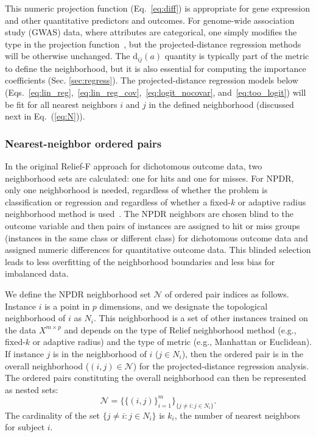 \documentclass[10pt]{article}
\begin{document}
This numeric projection function (Eq.~\ref{eq:diff}) is appropriate for gene expression and other quantitative predictors and outcomes. For genome-wide association study (GWAS) data, where attributes are categorical, one simply modifies the type in the projection function~\cite{titv}, but the projected-distance regression methods will be otherwise unchanged. The $\text{d}_{ij}(a)$ quantity is typically part of the metric to define the neighborhood, but it is also essential for computing the importance coefficients (Sec. \ref{sec:regress}).  The projected-distance regression models below (Eqs.~\ref{eq:lin_reg},~\ref{eq:lin_reg_cov},~\ref{eq:logit_nocovar}, and~\ref{eq:too_logit}) will be fit for all nearest neighbors $i$ and $j$ in the defined neighborhood (discussed next in Eq.~(\ref{eq:N})). 

\subsubsection{Nearest-neighbor ordered pairs}
In the original Relief-F approach for dichotomous outcome data, two neighborhood sets are calculated: one for hits and one for misses.
For NPDR, only one neighborhood is needed, regardless of whether the problem is classification or regression and regardless of whether a fixed-$k$ or adaptive radius neighborhood method is used~\cite{greene09,urbanowicz17,mckinney13}. The NPDR neighbors are chosen blind to the outcome variable and then pairs of instances are assigned to hit or miss groups (instances in the same class or different class) for dichotomous outcome data and assigned numeric differences for quantitative outcome data. This blinded selection leads to less overfitting of the neighborhood boundaries and less bias for imbalanced data.     

We define the NPDR neighborhood set $\mathcal{N}$ of ordered pair indices as follows. Instance $i$ is a point in $p$ dimensions, and we designate the topological neighborhood of $i$ as $N_{i}$. This neighborhood is a set of other instances trained on the data $X^{m \times p}$ and depends on the type of Relief neighborhood method (e.g., fixed-$k$ or adaptive radius) and the type of metric (e.g., Manhattan or Euclidean). If instance $j$ is in the neighborhood of $i$ ($j \in N_{i}$), then the ordered pair is in the overall neighborhood ($(i,j) \in \mathcal{N}$) for the projected-distance regression analysis. The ordered pairs constituting the overall neighborhood can then be represented as nested sets:
\begin{equation}\label{eq:N}
\mathcal{N}=\{\{(i, j)\}_{i=1}^{m}\}_{\{j \ne i : j \in N_{i}\}}.
\end{equation}
The cardinality of the set $\{j \ne i : j \in N_{i}\}$ is $k_i$, the number of nearest neighbors for subject $i$. 
\end{document}
